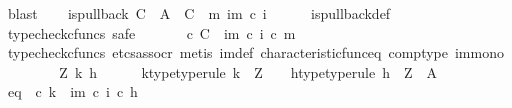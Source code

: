 \begin{isabellebody}
\ blast\isanewline
\ \ \isamarkupfalse%
\ {\isachardoublequoteopen}is{\isacharunderscore}{\kern0pt}pullback\ C\ {\isasymone}\ A\ {\isasymOmega}\ {\isacharparenleft}{\kern0pt}{\isasymbeta}\isactrlbsub C\isactrlesub {\isacharparenright}{\kern0pt}\ {\isasymt}\ m\ {\isacharparenleft}{\kern0pt}{\isasymchi}im\ {\isasymcirc}\isactrlsub c\ i{\isacharparenright}{\kern0pt}{\isachardoublequoteclose}\isanewline
\ \ \ \ \isamarkupfalse%
\ is{\isacharunderscore}{\kern0pt}pullback{\isacharunderscore}{\kern0pt}def\isanewline
\ \ \isamarkupfalse%
\ {\isacharparenleft}{\kern0pt}typecheck{\isacharunderscore}{\kern0pt}cfuncs{\isacharcomma}{\kern0pt}\ safe{\isacharparenright}{\kern0pt}\isanewline
\ \ \ \ \isamarkupfalse%
\ {\isachardoublequoteopen}{\isasymt}\ {\isasymcirc}\isactrlsub c\ {\isasymbeta}\isactrlbsub C\isactrlesub \ {\isacharequal}{\kern0pt}\ {\isacharparenleft}{\kern0pt}{\isasymchi}im\ {\isasymcirc}\isactrlsub c\ i{\isacharparenright}{\kern0pt}\ {\isasymcirc}\isactrlsub c\ m{\isachardoublequoteclose}\isanewline
\ \ \ \ \ \ \isamarkupfalse%
\ {\isacharparenleft}{\kern0pt}typecheck{\isacharunderscore}{\kern0pt}cfuncs{\isacharcomma}{\kern0pt}\ etcs{\isacharunderscore}{\kern0pt}assocr{\isacharcomma}{\kern0pt}\ metis\ {\isasymchi}im{\isacharunderscore}{\kern0pt}def\ characteristic{\isacharunderscore}{\kern0pt}func{\isacharunderscore}{\kern0pt}eq\ comp{\isacharunderscore}{\kern0pt}type\ im{\isacharunderscore}{\kern0pt}mono{\isacharparenright}{\kern0pt}\isanewline
\ \ \isamarkupfalse%
\isanewline
\ \ \ \ \isamarkupfalse%
\ Z\ k\ h\isanewline
\ \ \ \ \isamarkupfalse%
\ k{\isacharunderscore}{\kern0pt}type{\isacharbrackleft}{\kern0pt}type{\isacharunderscore}{\kern0pt}rule{\isacharbrackright}{\kern0pt}{\isacharcolon}{\kern0pt}\ {\isachardoublequoteopen}k\ {\isacharcolon}{\kern0pt}\ Z\ {\isasymrightarrow}\ {\isasymone}{\isachardoublequoteclose}\ \ h{\isacharunderscore}{\kern0pt}type{\isacharbrackleft}{\kern0pt}type{\isacharunderscore}{\kern0pt}rule{\isacharbrackright}{\kern0pt}{\isacharcolon}{\kern0pt}\ {\isachardoublequoteopen}h\ {\isacharcolon}{\kern0pt}\ Z\ {\isasymrightarrow}\ A{\isachardoublequoteclose}\isanewline
\ \ \ \ \isamarkupfalse%
\ eq{\isacharcolon}{\kern0pt}\ {\isachardoublequoteopen}{\isasymt}\ {\isasymcirc}\isactrlsub c\ k\ {\isacharequal}{\kern0pt}\ {\isacharparenleft}{\kern0pt}{\isasymchi}im\ {\isasymcirc}\isactrlsub c\ i{\isacharparenright}{\kern0pt}\ {\isasymcirc}\isactrlsub c\ h{\isachardoublequoteclose}\isanewline

\end{isabellebody}
